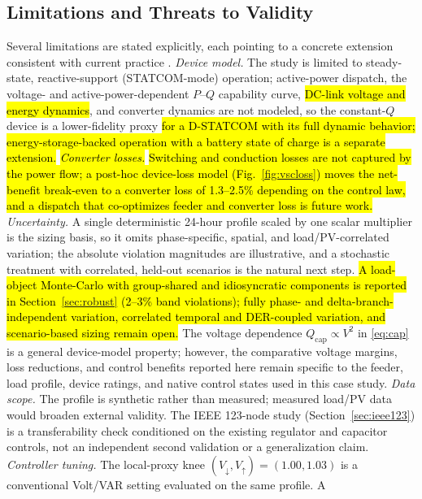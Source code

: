 \documentclass{ieeeaccess}
\newcommand{\rev}[1]{{\color{red}\hl{#1}}}
\newcommand{\rev}[1]{#1}
\begin{document}
\subsection{Limitations and Threats to Validity}
Several limitations are stated explicitly, each pointing to a concrete extension
consistent with current practice \cite{dar2024ccmpc,pvdstatcom2025fixedvar,statcom2025cmes}.
\emph{Device model.} The study is limited to steady-state, reactive-support
(STATCOM-mode) operation; active-power dispatch, the voltage- and
active-power-dependent $P$--$Q$ capability curve, \rev{DC-link voltage and energy dynamics}, and
converter dynamics are not modeled, so the constant-$Q$ device is a lower-fidelity
proxy \rev{for a D-STATCOM with its full dynamic behavior; energy-storage-backed operation
with a battery state of charge is a separate extension.}
\emph{\rev{Converter losses.}} \rev{Switching and conduction losses are not captured
by the power flow; a post-hoc device-loss model (Fig.~\mbox{\ref{fig:vscloss}}) moves
the net-benefit break-even to a converter loss of \mbox{1.3--2.5\%} depending on the
control law, and a dispatch that co-optimizes feeder and converter loss is future
work.}
\emph{Uncertainty.} A
single deterministic 24-hour profile scaled by one scalar multiplier is the sizing
basis, so it omits phase-specific, spatial, and load/PV-correlated variation; the absolute
violation magnitudes are illustrative, and a stochastic treatment with correlated,
held-out scenarios is the natural next step. \rev{A load-object Monte-Carlo with
group-shared and idiosyncratic components is reported in Section~\mbox{\ref{sec:robust}}
(\mbox{2--3\%} band violations); fully phase- and delta-branch-independent variation,
correlated temporal and DER-coupled variation, and scenario-based sizing remain open.} The voltage dependence $Q_{\mathrm{cap}}\propto V^2$ in \eqref{eq:cap} is a general
device-model property; however, the comparative voltage margins, loss reductions,
and control benefits reported here remain specific to the feeder, load profile,
device ratings, and native control states used in this case study.
\emph{Data scope.} The profile is synthetic rather than measured; measured
load/PV data would broaden external validity. The IEEE 123-node study
(Section~\ref{sec:ieee123}) is a transferability check conditioned on the existing
regulator and capacitor controls, not an independent second validation or a
generalization claim.
\emph{Controller tuning.} The local-proxy knee $(V_\downarrow,V_\uparrow)=(1.00,1.03)$
is a conventional Volt/VAR setting evaluated on the same profile. A
\end{document}
